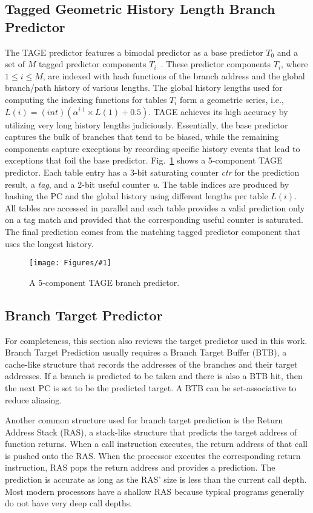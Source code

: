 \documentclass[conference]{IEEEtran}
\newcommand{\kfig}[4]{ %
        \begin{figure}[!t]
        \centering
        \texttt{[image: Figures/\#1]}
        \vspace{-1mm}
        \caption{#3}
        \vspace{-6mm}
        \label{#2}
        \end{figure}
}
\begin{document}
\subsection{Tagged Geometric History Length Branch Predictor}
\label{sec:scheme:tage}
The TAGE predictor features a bimodal predictor as a base predictor $T_0$  and a set of $M$ tagged predictor components $T_i$~\cite{tage}. These predictor components $T_i$, where $1\leq i\leq M$, are indexed with hash functions of the branch address and the global branch/path history of various lengths. The global history lengths used for computing the indexing functions for tables $T_i$ form a geometric series, i.e., $L(i) = (int)(\alpha^{i{}^{\_}1}\times L(1)+0.5)$. TAGE achieves its high accuracy by utilizing very long history lengths judiciously.
Essentially, the base predictor captures the bulk of branches that tend to be biased, while the remaining components capture exceptions by recording specific history events that lead to exceptions that foil the base predictor.
Fig.~\ref{fig:tage} shows a 5-component TAGE predictor. Each table entry has a 3-bit saturating counter \textit{ctr} for the prediction result, a \textit{tag}, and a 2-bit useful counter \textit{u}. The table indices are produced by hashing the PC and the global history using different lengths per table $L(i)$. All tables are accessed in parallel and each table provides a valid prediction only on a tag match and provided that the corresponding useful counter is saturated. The final prediction comes from the matching tagged predictor component that uses the longest history. \vspace{-2mm}
\kfig{tage.pdf}{fig:tage}{A 5-component TAGE branch predictor.}{angle = 0, trim = 0.6in 0.6in 0.4in 0.2in, clip, width=0.5\textwidth}


\subsection{Branch Target Predictor}
\label{sec:scheme:target}
For completeness, this section also reviews the target predictor used in this work. Branch Target Prediction usually requires a Branch Target Buffer (BTB), a cache-like structure that records the addresses of the branches and their target addresses. If a branch is predicted to be taken and there is also a BTB hit, then the next PC is set to be the predicted target. A BTB can be set-associative to reduce aliasing.

Another common structure used for branch target prediction is the Return Address Stack (RAS),  a stack-like structure that predicts the target address of function returns. When a call instruction executes, the return address of that call is pushed onto the RAS. When the processor executes the corresponding return instruction, RAS pops the return address and provides a prediction. The prediction is accurate as long as the RAS' size is less than the current call depth. Most modern processors have a shallow RAS because typical programs generally do not have very deep call depths.
\end{document}
